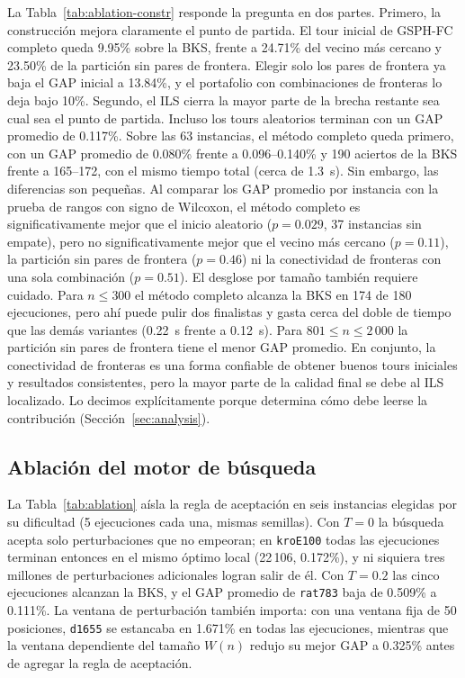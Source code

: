 \documentclass[runningheads]{llncs}
\begin{document}
La Tabla~\ref{tab:ablation-constr} responde la pregunta en dos partes.
Primero, la construcción mejora claramente el punto de partida. El tour
inicial de GSPH-FC completo queda 9.95\% sobre la BKS, frente a 24.71\%
del vecino más cercano y 23.50\% de la partición sin pares de frontera.
Elegir solo los pares de frontera ya baja el GAP inicial a 13.84\%, y el
portafolio con combinaciones de fronteras lo deja bajo 10\%. Segundo, el
ILS cierra la mayor parte de la brecha restante sea cual sea el punto de
partida. Incluso los tours aleatorios terminan con un GAP promedio de
0.117\%. Sobre las 63 instancias, el método completo queda primero, con
un GAP promedio de 0.080\% frente a 0.096--0.140\% y 190 aciertos de la
BKS frente a 165--172, con el mismo tiempo total (cerca de 1.3~s). Sin
embargo, las diferencias son pequeñas. Al comparar los GAP promedio por
instancia con la prueba de rangos con signo de Wilcoxon, el método
completo es significativamente mejor que el inicio aleatorio
($p=0.029$, 37 instancias sin empate), pero no significativamente mejor
que el vecino más cercano ($p=0.11$), la partición sin pares de frontera
($p=0.46$) ni la conectividad de fronteras con una sola combinación
($p=0.51$). El desglose por tamaño también requiere cuidado. Para
$n\le 300$ el método completo alcanza la BKS en 174 de 180 ejecuciones,
pero ahí puede pulir dos finalistas y gasta cerca del doble de tiempo
que las demás variantes (0.22~s frente a 0.12~s). Para
$801\le n\le 2\,000$ la partición sin pares de frontera tiene el menor
GAP promedio. En conjunto, la conectividad de fronteras es una forma
confiable de obtener buenos tours iniciales y resultados consistentes,
pero la mayor parte de la calidad final se debe al ILS localizado. Lo
decimos explícitamente porque determina cómo debe leerse la contribución
(Sección~\ref{sec:analysis}).

\subsection{Ablación del motor de búsqueda}

La Tabla~\ref{tab:ablation} aísla la regla de aceptación en seis
instancias elegidas por su dificultad (5 ejecuciones cada una, mismas
semillas). Con $T=0$ la búsqueda acepta solo perturbaciones que no
empeoran; en \texttt{kroE100} todas las ejecuciones terminan entonces en
el mismo óptimo local (22\,106, 0.172\%), y ni siquiera tres millones de
perturbaciones adicionales logran salir de él. Con $T=0.2$ las cinco
ejecuciones alcanzan la BKS, y el GAP promedio de \texttt{rat783} baja de
0.509\% a 0.111\%. La ventana de perturbación también importa: con una
ventana fija de 50 posiciones, \texttt{d1655} se estancaba en 1.671\% en
todas las ejecuciones, mientras que la ventana dependiente del tamaño
$W(n)$ redujo su mejor GAP a 0.325\% antes de agregar la regla de
aceptación.
\end{document}
